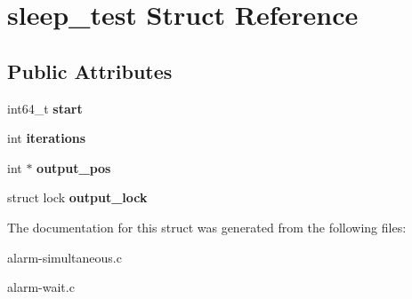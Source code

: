 \hypertarget{structsleep__test}{}\section{sleep\+\_\+test Struct Reference}
\label{structsleep__test}
\subsection*{Public Attributes}
\begin{DoxyCompactItemize}
\item 
int64\+\_\+t {\bfseries start}\hypertarget{structsleep__test_afb1da10abae44629c91fe74ee89a3bf7}{}\label{structsleep__test_afb1da10abae44629c91fe74ee89a3bf7}

\item 
int {\bfseries iterations}\hypertarget{structsleep__test_ae2d15a3e4632be1bbb987bb4d09dbd5b}{}\label{structsleep__test_ae2d15a3e4632be1bbb987bb4d09dbd5b}

\item 
int $\ast$ {\bfseries output\+\_\+pos}\hypertarget{structsleep__test_ad5666bfb7be615db5c1a4bdba179eace}{}\label{structsleep__test_ad5666bfb7be615db5c1a4bdba179eace}

\item 
struct lock {\bfseries output\+\_\+lock}\hypertarget{structsleep__test_ac612cd10b7449b186b0e6a70a19c18ec}{}\label{structsleep__test_ac612cd10b7449b186b0e6a70a19c18ec}

\end{DoxyCompactItemize}


The documentation for this struct was generated from the following files\+:\begin{DoxyCompactItemize}
\item 
alarm-\/simultaneous.\+c\item 
alarm-\/wait.\+c\end{DoxyCompactItemize}
